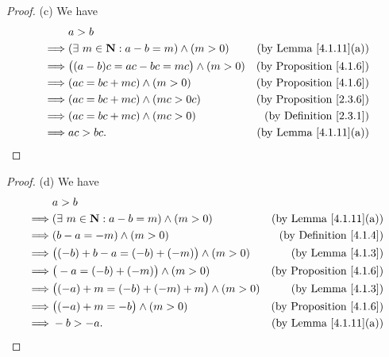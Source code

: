 \begin{proof}{(c)}
    We have
    \begin{align*}
                 & a > b                                                                                       \\
        \implies & (\exists\ m \in \mathbf{N} : a - b = m) \land (m > 0) & \text{(by Lemma \ref{4.1.11}(a))}   \\
        \implies & \big((a - b)c = ac - bc = mc\big) \land (m > 0)       & \text{(by Proposition \ref{4.1.6})} \\
        \implies & (ac = bc + mc) \land (m > 0)                          & \text{(by Proposition \ref{4.1.6})} \\
        \implies & (ac = bc + mc) \land (mc > 0c)                        & \text{(by Proposition \ref{2.3.6})} \\
        \implies & (ac = bc + mc) \land (mc > 0)                         & \text{(by Definition \ref{2.3.1})}  \\
        \implies & ac > bc.                                              & \text{(by Lemma \ref{4.1.11}(a))}
    \end{align*}
\end{proof}

\begin{proof}{(d)}
    We have
    \begin{align*}
                 & a > b                                                                                       \\
        \implies & (\exists\ m \in \mathbf{N} : a - b = m) \land (m > 0) & \text{(by Lemma \ref{4.1.11}(a))}   \\
        \implies & (b - a = -m) \land (m > 0)                            & \text{(by Definition \ref{4.1.4})}  \\
        \implies & \big((-b) + b - a = (-b) + (-m)\big) \land (m > 0)    & \text{(by Lemma \ref{4.1.3})}       \\
        \implies & \big(-a = (-b) + (-m)\big) \land (m > 0)              & \text{(by Proposition \ref{4.1.6})} \\
        \implies & \big((-a) + m = (-b) + (-m) + m\big) \land (m > 0)    & \text{(by Lemma \ref{4.1.3})}       \\
        \implies & \big((-a) + m = -b\big) \land (m > 0)                 & \text{(by Proposition \ref{4.1.6})} \\
        \implies & -b > -a.                                              & \text{(by Lemma \ref{4.1.11}(a))}
    \end{align*}
\end{proof}

